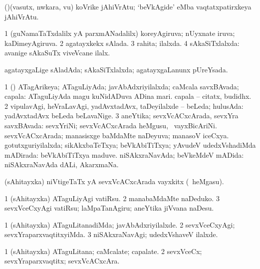\bentry 
{} 
\gl{\nA}
\expl{}
\bmng
(\ame)(vasutx, nwkara, \mo vu) koVrike jAhiVrAtu; `beVkAgide' eMba vaqtatxpatirxkeya jAhiVrAtu. 
\emng
\eentry

\bentry
{} 
\gl{\gu}
\expl{}
\bmng
\bnum
\num{1} (guNamaTaTxdalilx yA parxmANadalilx) koreyAgiruva; nUyxnate iruva; kaDimeyAgiruva. 
\num{2} agatayxkekx sAlada. 
\num{3} rahita; ilalxda. 
\num{4} sAkaSiTxlalxda:  avanige sAkaSuTx viveVcane ilalx. 
\enum
\emng

\noindent 
\gl{\pagu}
\expl{}
\bmng
{} agatayxgaLige sAladAda; sAkaSiTxlalxda; agatayxgaLanunx pUreYsada. 
\emng
\eentry

\bentry 
{} 
\gl{\gu}
\expl{}
\bmng
\bnum
\num{1} (\pArxparx) ATagArikeya; ATaguLiyAda; javAbAdxriyilalxda; caMcala savxBAvada; capala:  ATaguLiyAda magu  kuNidADuva ADina mari.  capala -- citatx, budidhx. 
\num{2} vipulavAgi, heVraLavAgi, yadAvxtadAvx, taDeyilalxde -- beLeda; hulusAda:  yadAvxtadAvx beLeda beLavaNige. 
\num{3} aneYtika; sevxVcACxcArada, sevxYra savxBAvada:  sevxYriNi; sevxVcACxcArada heMgusu, \kanmu\ vayxBicAriNi. 
\banum
{} sevxVcACxcArada; manasisxge baMdaMte naDeyuva; manasoV iceCxya. 
 gotutxguriyilalxda; sikAkxbaTeTxya; beVkAbiTiTxya; yAvudeV udedxVshadiMda mADirada:  beVkAbiTiTxya maduve. 
 niSAkxraNavAda; beVkeMdeV mADida:  niSAkxraNavAda dALi, AkarxmaNa. 
\eanum
\numie
\enum
\emng
\eentry

\bentry 
{} 
\gl{\nA}
\expl{}
\bmng
(sAhitayxka) niVtigeTaTx yA sevxVcACxcArada vayxkitx (\kanmu\ heMgasu). 
\emng
\eentry

\bentry 
{} 
\gl{\akirx}
\expl{}
\bmng
\bnum
\num{1} (sAhitayxka) ATaguLiyAgi vatiRsu. 
\num{2} manabaMdaMte naDeduko. 
\num{3} sevxVceCxyAgi vatiRsu; laMpaTanAgiru; aneYtika jiVvana naDesu. 
\enum
\emng
\eentry

\bentry
{} 
\gl{\kirxvi}
\expl{}
\bmng
\bnum
\num{1} (sAhitayxka) ATaguLitanadiMda; javAbAdxriyilalxde. 
\num{2} sevxVceCxyAgi; sevxYraparxvaqtitxyiMda. 
\num{3} niSAkxraNavAgi; udedxVshaveV ilalxde. 
\enum
\emng
\eentry

\bentry
{} 
\gl{\nA}
\expl{}
\bmng
\bnum
\num{1} (sAhitayxka) ATaguLitana; caMcalate; capalate. 
\num{2} sevxVceCx; sevxYraparxvaqtitx; sevxVcACxcAra. 
\enum
\emng
\eentry

